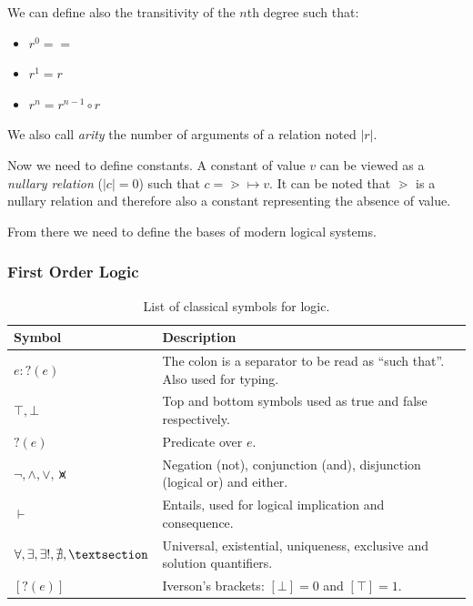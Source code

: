\documentclass[11pt,a4paper,twoside,openright,titlepage,numbers=noenddot,headinclude,cleardoublepage=empty,openany]{scrreprt}
\theoremstyle{plain}
\theoremstyle{definition}
\theoremstyle{remark}
\providecommand{\tightlist}{%
  \setlength{\itemsep}{0pt}\setlength{\parskip}{0pt}}
\begin{document}
We can define also the transitivity of the \(n\)th degree such that:

\begin{itemize}
\tightlist
\item
  \(r^0 = =\)
\item
  \(r^1 = r\)
\item
  \(r^n = r^{n-1} \circ r\)
\end{itemize}

We also call \emph{arity} the number of arguments of a relation noted
\(|r|\).

Now we need to define constants. A constant of value \(v\) can be viewed
as a \emph{nullary relation} (\(|c| = 0\)) such that
\(c = \gtrdot \mapsto v\). It can be noted that \(\gtrdot\) is a nullary
relation and therefore also a constant representing the absence of
value.

From there we need to define the bases of modern logical systems.

\hypertarget{first-order-logic}{%
\subsubsection{First Order Logic}\label{first-order-logic}}

\hypertarget{tbl:logic}{}
\begin{table}\footnotesize
\centering

\caption{\label{tbl:logic}List of classical symbols for logic.}

\begin{tabular}{@{}ll@{}}
\toprule

\textbf{Symbol} & \textbf{Description} \\\midrule

\(e : ?(e)\) & The colon is a separator to be read as ``such that''.
Also used for typing. \\
\(\top, \bot\) & Top and bottom symbols used as true and false
respectively. \\
\(?(e)\) & Predicate over \(e\). \\
\(\lnot, \land, \lor, \veeonwedge\) & Negation (not), conjunction (and),
disjunction (logical or) and either. \\
\(\vdash\) & Entails, used for logical implication and consequence. \\
\(\forall, \exists, \exists!, \nexists, \textsection\) & Universal,
existential, uniqueness, exclusive and solution quantifiers. \\
\([?(e)]\) & Iverson's brackets: \([\bot]=0\) and \([\top]=1\). \\

\bottomrule
\end{tabular}

\end{table}
\end{document}
